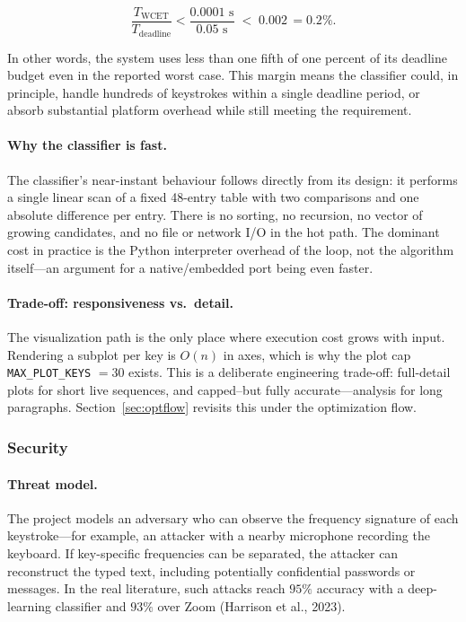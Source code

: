 \documentclass[11pt,a4paper]{article}
\begin{document}
\[
\frac{T_{\text{WCET}}}{T_{\text{deadline}}} < \frac{0.0001\text{ s}}
{0.05\text{ s}} \;<\; 0.002\, = 0.2\%.
\]

In other words, the system uses less than one fifth of one percent of its
deadline budget even in the reported worst case. This margin means the
classifier could, in principle, handle hundreds of keystrokes within a single
deadline period, or absorb substantial platform overhead while still meeting
the requirement.

\paragraph{Why the classifier is fast.}
The classifier's near-instant behaviour follows directly from its design: it
performs a single linear scan of a fixed 48-entry table with two comparisons
and one absolute difference per entry. There is no sorting, no recursion, no
vector of growing candidates, and no file or network I/O in the hot path. The
dominant cost in practice is the Python interpreter overhead of the loop, not
the algorithm itself---an argument for a native/embedded port being even
faster.

\paragraph{Trade-off: responsiveness vs.\ detail.}
The visualization path is the only place where execution cost grows with input.
Rendering a subplot per key is $O(n)$ in axes, which is why the plot cap
\texttt{MAX\_PLOT\_KEYS} $= 30$ exists. This is a deliberate engineering
trade-off: full-detail plots for short live sequences, and capped--but fully
accurate---analysis for long paragraphs. Section~\ref{sec:optflow} revisits
this under the optimization flow.

\subsubsection{Security}

\paragraph{Threat model.}
The project models an adversary who can observe the frequency signature of
each keystroke---for example, an attacker with a nearby microphone recording
the keyboard. If key-specific frequencies can be separated, the attacker can
reconstruct the typed text, including potentially confidential passwords or
messages. In the real literature, such attacks reach $95\%$ accuracy with a
deep-learning classifier and $93\%$ over Zoom (Harrison et al., 2023).
\end{document}
